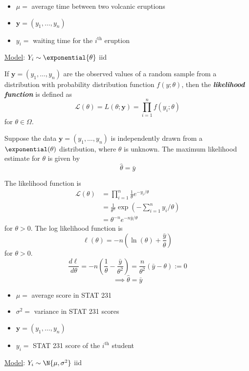 \begin{Example}{}{}
    \begin{itemize}
        \item $ \mu= $ average time between two volcanic eruptions
        \item $ \symbf{y}=(y_1,\ldots ,y_n) $
        \item $ y_i= $ waiting time for the $ i^{\text{th}} $ eruption
    \end{itemize}
    \underline{Model}: $ Y_i \sim \exponential{\theta} $ iid
\end{Example}



\begin{Definition}{}{}
    If $ \symbf{y}=(y_1,\ldots ,y_n) $ are the observed values of a random sample from a distribution with
    probability distribution function $ f(y;\theta) $, then the \textbf{\emph{likelihood function}}
    is defined as
    \[ \mathcal{L}(\theta)=L(\theta;\symbf{y})=\prod_{i=1}^n f(y_i;\theta) \]
    for $ \theta\in\Omega $.
\end{Definition}



\begin{Proposition}{}{}
    Suppose the data $ \symbf{y}=(y_1,\ldots ,y_n) $ is independently
    drawn from a $ \exponential(\theta) $ distribution, where $ \theta $ is unknown.
    The maximum likelihood estimate for $ \theta $ is given by
    \[ \hat{\theta}=\bar{y} \]
\end{Proposition}

\begin{Proof}{}{}
    The likelihood function is
    \begin{align*}
        \mathcal{L}(\theta)
         & =\prod_{i=1}^n \frac{1}{\theta} e^{-y_i/\theta}                        \\
         & =\frac{1}{\theta^n} \exp\left(-\sum\limits_{i=1}^{n} y_i/\theta\right) \\
         & =\theta^{-n}e^{-n\bar{y}/\theta}
    \end{align*}
    for $ \theta>0 $. The log likelihood function is
    \[ \ell(\theta)=-n\left( \ln(\theta)+\frac{\bar{y}}{\theta} \right) \]
    for $ \theta>0 $.
    \[ \frac{d\ell}{d\theta} =-n\left( \frac{1}{\theta} -\frac{\bar{y}}{\theta^2} \right)=
        \frac{n}{\theta^2} \left( \bar{y}-\theta \right):=0 \]
    \[ \implies \hat{\theta}=\bar{y} \]
\end{Proof}


\begin{Example}{}{}
    \begin{itemize}
        \item $ \mu = $ average score in STAT 231
        \item $ \sigma^2= $ variance in STAT 231 scores
        \item $ \symbf{y}=(y_1,\ldots ,y_n) $
        \item $ y_i= $ STAT 231 score of the $ i^{\text{th}} $ student
    \end{itemize}
    \underline{Model}: $ Y_i \sim \N{\mu,\sigma^2} $ iid
\end{Example}



